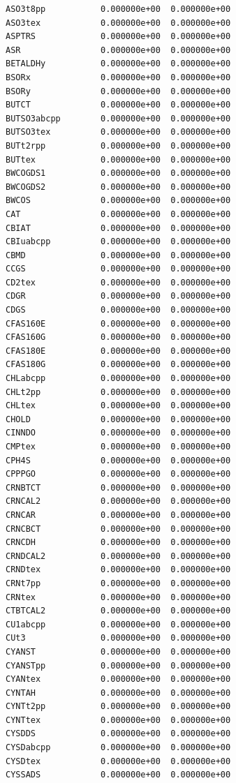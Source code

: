 \documentclass{scrartcl}
\begin{document}
\begin{enumerate}
\begin{lstlisting}
ASO3t8pp           0.000000e+00  0.000000e+00
ASO3tex            0.000000e+00  0.000000e+00
ASPTRS             0.000000e+00  0.000000e+00
ASR                0.000000e+00  0.000000e+00
BETALDHy           0.000000e+00  0.000000e+00
BSORx              0.000000e+00  0.000000e+00
BSORy              0.000000e+00  0.000000e+00
BUTCT              0.000000e+00  0.000000e+00
BUTSO3abcpp        0.000000e+00  0.000000e+00
BUTSO3tex          0.000000e+00  0.000000e+00
BUTt2rpp           0.000000e+00  0.000000e+00
BUTtex             0.000000e+00  0.000000e+00
BWCOGDS1           0.000000e+00  0.000000e+00
BWCOGDS2           0.000000e+00  0.000000e+00
BWCOS              0.000000e+00  0.000000e+00
CAT                0.000000e+00  0.000000e+00
CBIAT              0.000000e+00  0.000000e+00
CBIuabcpp          0.000000e+00  0.000000e+00
CBMD               0.000000e+00  0.000000e+00
CCGS               0.000000e+00  0.000000e+00
CD2tex             0.000000e+00  0.000000e+00
CDGR               0.000000e+00  0.000000e+00
CDGS               0.000000e+00  0.000000e+00
CFAS160E           0.000000e+00  0.000000e+00
CFAS160G           0.000000e+00  0.000000e+00
CFAS180E           0.000000e+00  0.000000e+00
CFAS180G           0.000000e+00  0.000000e+00
CHLabcpp           0.000000e+00  0.000000e+00
CHLt2pp            0.000000e+00  0.000000e+00
CHLtex             0.000000e+00  0.000000e+00
CHOLD              0.000000e+00  0.000000e+00
CINNDO             0.000000e+00  0.000000e+00
CMPtex             0.000000e+00  0.000000e+00
CPH4S              0.000000e+00  0.000000e+00
CPPPGO             0.000000e+00  0.000000e+00
CRNBTCT            0.000000e+00  0.000000e+00
CRNCAL2            0.000000e+00  0.000000e+00
CRNCAR             0.000000e+00  0.000000e+00
CRNCBCT            0.000000e+00  0.000000e+00
CRNCDH             0.000000e+00  0.000000e+00
CRNDCAL2           0.000000e+00  0.000000e+00
CRNDtex            0.000000e+00  0.000000e+00
CRNt7pp            0.000000e+00  0.000000e+00
CRNtex             0.000000e+00  0.000000e+00
CTBTCAL2           0.000000e+00  0.000000e+00
CU1abcpp           0.000000e+00  0.000000e+00
CUt3               0.000000e+00  0.000000e+00
CYANST             0.000000e+00  0.000000e+00
CYANSTpp           0.000000e+00  0.000000e+00
CYANtex            0.000000e+00  0.000000e+00
CYNTAH             0.000000e+00  0.000000e+00
CYNTt2pp           0.000000e+00  0.000000e+00
CYNTtex            0.000000e+00  0.000000e+00
CYSDDS             0.000000e+00  0.000000e+00
CYSDabcpp          0.000000e+00  0.000000e+00
CYSDtex            0.000000e+00  0.000000e+00
CYSSADS            0.000000e+00  0.000000e+00

\end{lstlisting}
\end{enumerate}
\end{document}
